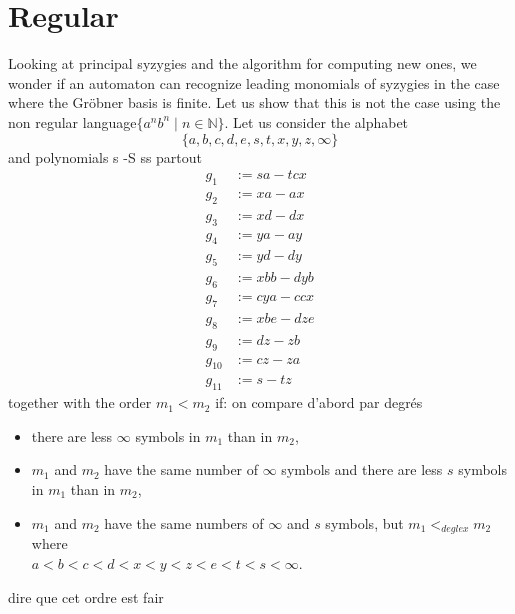 \documentclass[sigconf]{acmart}
\theoremstyle{plain}
\theoremstyle{definition}
\theoremstyle{remark}
\newcommand{\N}{\mathbb{N}}
\newcommand\fixmecc[1]{{\color{red}{\underline{\bf C:}} #1}}
\begin{document}
\section{Regular}

Looking at principal syzygies and the algorithm for computing new ones, we wonder if an automaton can recognize leading monomials of syzygies in the case where the Gröbner basis is finite. Let us show that this is not the case using the non regular language\linebreak $\{a^nb^n \;|\; n \in \N\}$. Let us consider the alphabet 
$$\{a, b, c, d, e, s, t, x, y, z, \infty\}$$
and polynomials
\fixmecc{s -S ss partout}
\begin{align*}
g_1 & := sa - tcx \\
g_2 & := xa - ax \\
g_3 & := xd - dx \\
g_4 & := ya - ay \\
g_5 & := yd - dy \\
g_6 & := xbb - dyb \\
g_7 & := cya - ccx \\
g_8 & := xbe - dze \\
g_9 & := dz - zb \\
g_{10} & := cz - za \\
g_{11} & := s-tz
\end{align*}
together with the order $m_1 < m_2$ if:
\fixmecc{on compare d'abord par degrés}
\begin{itemize}
\item there are less $\infty$ symbols in $m_1$ than in $m_2$,
\item $m_1$ and $m_2$ have the same number of $\infty$ symbols and there are less $s$ symbols in $m_1$ than in $m_2$,
\item $m_1$ and $m_2$ have the same numbers of $\infty$ and $s$ symbols, but
$m_1 <_{deglex} m_2$ where\\ $a < b < c < d < x < y < z < e < t < s < \infty$.
\end{itemize}

\fixmecc{dire que cet ordre est fair}
\end{document}
